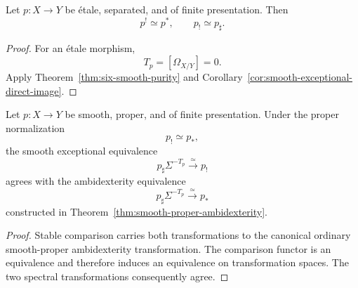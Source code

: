 \begin{corollary}
\label{cor:six-etale-purity}
Let \(p:X\to Y\) be \'{e}tale, separated, and of finite presentation.  Then
\[
    p^!\simeq p^*,
    \qquad
    p_!\simeq p_\sharp.
\]
\end{corollary}

\begin{proof}
For an \'{e}tale morphism,
\[
    T_p=[\Omega_{X/Y}]=0.
\]
Apply Theorem~\ref{thm:six-smooth-purity} and
Corollary~\ref{cor:smooth-exceptional-direct-image}.
\end{proof}

\begin{theorem}
\label{thm:smooth-purity-ambidexterity-compatibility}
Let \(p:X\to Y\) be smooth, proper, and of finite presentation.  Under the
proper normalization
\[
    p_!\simeq p_*,
\]
the smooth exceptional equivalence
\[
    p_\sharp\Sigma^{-T_p}
    \xrightarrow{\simeq}
    p_!
\]
agrees with the ambidexterity equivalence
\[
    p_\sharp\Sigma^{-T_p}
    \xrightarrow{\simeq}
    p_*
\]
constructed in
Theorem~\ref{thm:smooth-proper-ambidexterity}.
\end{theorem}

\begin{proof}
Stable comparison carries both transformations to the canonical ordinary
smooth-proper ambidexterity transformation.  The comparison functor is an
equivalence and therefore induces an equivalence on transformation spaces.
The two spectral transformations consequently agree.
\end{proof}

